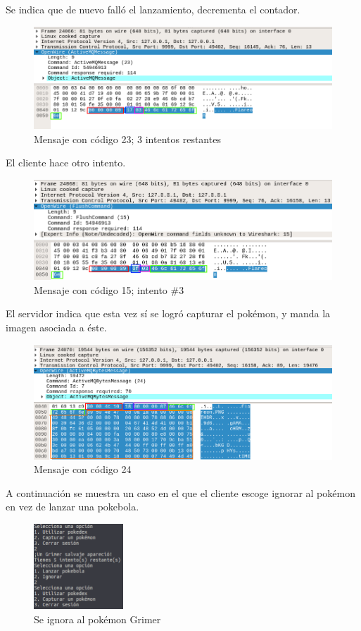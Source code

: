 \documentclass[12pt]{article}
\begin{document}
Se indica que de nuevo falló el lanzamiento, decrementa el contador.
\begin{figure}[H]
  \centering
  \includegraphics[width=\textwidth]{20}
  \caption{Mensaje con código 23; 3 intentos restantes}
\end{figure}

El cliente hace otro intento.
\begin{figure}[H]
  \centering
  \includegraphics[width=\textwidth]{21}
  \caption{Mensaje con código 15; intento $\#$3}
\end{figure}

El servidor indica que esta vez sí se logró capturar el pokémon, y manda la imagen asociada a éste.
\begin{figure}[H]
  \centering
  \includegraphics[width=\textwidth]{22}
  \caption{Mensaje con código 24}
\end{figure}

A continuación se muestra un caso en el que el cliente escoge ignorar al pokémon en vez de lanzar una pokebola.
\begin{figure}[H]
  \centering
  \includegraphics[width=0.3\textwidth]{23}
  \caption{Se ignora al pokémon Grimer}
\end{figure}
\end{document}
